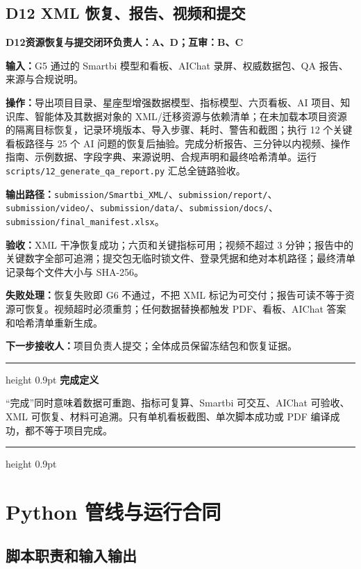 \documentclass[UTF8,fontset=windows,12pt,openany]{ctexbook}
\newenvironment{gatebox}[1][]{%
  \par\medskip\noindent\begin{center}\begin{minipage}{0.93\textwidth}%
  \color{GoldLine}\hrule height 0.9pt\vspace{0.45em}%
  \textbf{#1}\par\smallskip\color{black}%
}{%
  \par\vspace{0.35em}\color{GoldLine}\hrule height 0.9pt%
  \end{minipage}\end{center}\medskip%
}
\newcommand{\File}[1]{{\small\nolinkurl{#1}}}
\newcommand{\StepTitle}[3]{%
  \noindent\colorbox{DeepNavy}{\parbox{0.965\textwidth}{\color{white}\Large\bfseries #1\quad #2\hfill\normalsize #3}}\par\medskip
}
\newcommand{\CardRow}[2]{\noindent\textbf{#1：}#2\par}
\begin{document}
\newpage
\section{D12 XML 恢复、报告、视频和提交}
\StepTitle{D12}{资源恢复与提交闭环}{负责人：A、D；互审：B、C}
\CardRow{输入}{G5 通过的 Smartbi 模型和看板、AIChat 录屏、权威数据包、QA 报告、来源与合规说明。}
\CardRow{操作}{导出项目目录、星座型增强数据模型、指标模型、六页看板、AI 项目、知识库、智能体及其数据对象的 XML/迁移资源与依赖清单；在未加载本项目资源的隔离目标恢复，记录环境版本、导入步骤、耗时、警告和截图；执行 12 个关键看板路径与 25 个 AI 问题的恢复后抽验。完成分析报告、三分钟以内视频、操作指南、示例数据、字段字典、来源说明、合规声明和最终哈希清单。运行 \File{scripts/12_generate_qa_report.py} 汇总全链路验收。}
\CardRow{输出路径}{\File{submission/Smartbi_XML/}、\File{submission/report/}、\File{submission/video/}、\File{submission/data/}、\File{submission/docs/}、\File{submission/final_manifest.xlsx}。}
\CardRow{验收}{XML 干净恢复成功；六页和关键指标可用；视频不超过 3 分钟；报告中的关键数字全部可追溯；提交包无临时锁文件、登录凭据和绝对本机路径；最终清单记录每个文件大小与 SHA-256。}
\CardRow{失败处理}{恢复失败即 G6 不通过，不把 XML 标记为可交付；报告可读不等于资源可恢复。视频超时必须重剪；任何数据替换都触发 PDF、看板、AIChat 答案和哈希清单重新生成。}
\CardRow{下一步接收人}{项目负责人提交；全体成员保留冻结包和恢复证据。}

\begin{gatebox}[完成定义]
“完成”同时意味着数据可重跑、指标可复算、Smartbi 可交互、AIChat 可验收、XML 可恢复、材料可追溯。只有单机看板截图、单次脚本成功或 PDF 编译成功，都不等于项目完成。
\end{gatebox}

\chapter{Python 管线与运行合同}

\section{脚本职责和输入输出}
\end{document}
